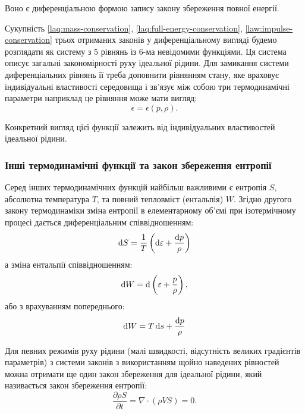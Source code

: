 Воно є диференціальною формою запису закону збереження повної енергії. \medskip

Сукупність \ref{laq:mass-conservation}, \ref{laq:full-energy-conservation}, \ref{law:impulse-conservation} трьох отриманих законів у диференціальному вигляді будемо розглядати як систему з 5 рівнянь із 6-ма невідомими функціями. Ця система описує загальні закономірності руху ідеальної рідини. Для замикання системи диференціальних рівнянь її треба доповнити рівнянням стану, яке враховує індивідуальні властивості середовища і зв'язує між собою три термодинамічні параметри наприклад це рівняння може мати вигляд:
\begin{equation}
	\epsilon = \epsilon(p, \rho).
\end{equation}

Конкретний вигляд цієї функції залежить від індивідуальних властивостей ідеальної рідини. 

\subsubsection{Інші термодинамічні функції та закон збереження ентропії}

Серед інших термодинамічних функцій найбільш важливими є ентропія $S$, абсолютна температура $T$, та повний тепловміст (ентальпія) $W$. Згідно другого закону термодинаміки зміна ентропії в елементарному об'ємі при ізотермічному процесі дається диференціальним співвідношенням:
\begin{equation}
	\mathop{}\!\mathrm{d} S = \frac{1}{T} \left( \mathop{}\!\mathrm{d} \varepsilon + \frac{\mathop{}\!\mathrm{d} p}{\rho} \right)
\end{equation}
а зміна ентальпії співвідношенням:
\begin{equation}
	\mathop{}\!\mathrm{d} W = \mathop{}\!\mathrm{d} \left( \varepsilon + \frac{p}{\rho} \right),
\end{equation}
або з врахуванням попереднього:
\begin{equation}
	\mathop{}\!\mathrm{d} W = T \mathop{}\!\mathrm{d} s + \frac{\mathop{}\!\mathrm{d} p}{\rho}
\end{equation}

Для певних режимів руху рідини (малі швидкості, відсутність великих градієнтів параметрів) з системи законів з використанням щойно наведених рівностей можна отримати ще один закон збереження для ідеальної рідини, який називається закон збереження ентропії:
\begin{equation}
	\frac{\partial \rho S}{\partial t} = \nabla \cdot (\rho V S) = 0.
\end{equation}


